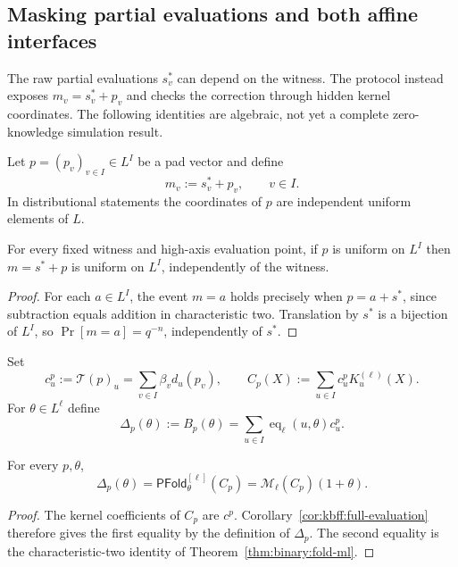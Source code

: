 \subsection{Masking partial evaluations and both affine interfaces}\label{sec:packing:masked}
The raw partial evaluations $s_v^*$ can depend on the witness.
The protocol instead exposes $m_v=s_v^*+p_v$ and checks
the correction through hidden kernel coordinates.
The following identities are algebraic, not yet a complete
zero-knowledge simulation result.

\begin{definition}\label{def:pack:pads}
Let $p=(p_v)_{v\in I}\in L^I$ be a pad vector and define
\[
 \boxed{m_v:=s_v^*+p_v,\qquad v\in I.}
\]
In distributional statements the coordinates of $p$
are independent uniform elements of $L$.
\end{definition}

\begin{lemma}\label{lem:pack:masked-uniform}
For every fixed witness and high-axis evaluation point,
if $p$ is uniform on $L^I$ then $m=s^*+p$ is uniform
on $L^I$, independently of the witness.
\end{lemma}
\begin{proof}
For each $a\in L^I$, the event $m=a$ holds precisely when
$p=a+s^*$, since subtraction equals addition in
characteristic two. Translation by $s^*$ is a bijection
of $L^I$, so $\Pr[m=a]=q^{-n}$, independently of $s^*$.
\end{proof}

\begin{definition}\label{def:pack:pad-coeff}
Set
\[
 c^p_u:=\mathcal T(p)_u=\sum_{v\in I}\beta_vd_u(p_v),
 \qquad
 C_p(X):=\sum_{u\in I}c^p_uK_u^{(\ell)}(X).
\]
For $\theta\in L^\ell$ define
\[
 \Delta_p(\theta):=B_p(\theta)
 =\sum_{u\in I}\operatorname{eq}_\ell(u,\theta)c^p_u.
\]
\end{definition}

\begin{lemma}\label{lem:pack:pad-kernel}
For every $p,\theta$,
\[
 \boxed{\Delta_p(\theta)
 =\mathsf{PFold}^{[\ell]}_\theta(C_p)
 =\mathscr M_\ell(C_p)(1+\theta).}
\]
\end{lemma}
\begin{proof}
The kernel coefficients of $C_p$ are $c^p$.
Corollary~\ref{cor:kbff:full-evaluation} therefore gives
the first equality by the definition of $\Delta_p$.
The second equality is the characteristic-two identity
of Theorem~\ref{thm:binary:fold-ml}.
\end{proof}

